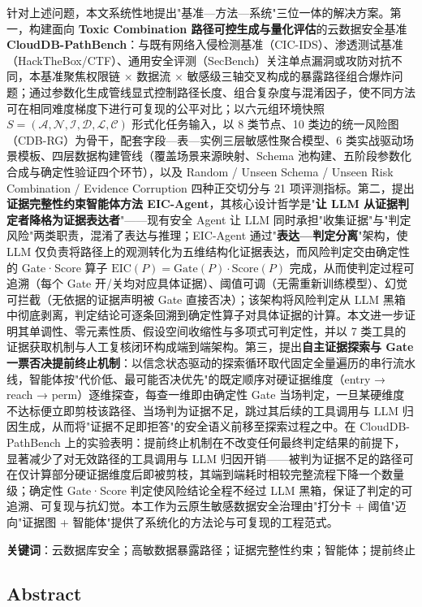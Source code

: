 \documentclass[a4paper,12pt]{ctexart}
\begin{document}
针对上述问题，本文系统性地提出"基准—方法—系统"三位一体的解决方案。第一，构建面向 \textbf{Toxic Combination 路径可控生成与量化评估}的云数据安全基准 \textbf{CloudDB-PathBench}：与既有网络入侵检测基准（CIC-IDS）、渗透测试基准（HackTheBox/CTF）、通用安全评测（SecBench）关注单点漏洞或攻防对抗不同，本基准聚焦权限链 × 数据流 × 敏感级三轴交叉构成的暴露路径组合爆炸问题；通过参数化生成管线显式控制路径长度、组合复杂度与混淆因子，使不同方法可在相同难度梯度下进行可复现的公平对比；以六元组环境快照 $S=(\mathcal{A},\mathcal{N},\mathcal{I},\mathcal{D},\mathcal{L},\mathcal{C})$ 形式化任务输入，以 8 类节点、10 类边的统一风险图（CDB-RG）为骨干，配套字段—表—实例三层敏感性聚合模型、6 类实战驱动场景模板、四层数据构建管线（覆盖场景来源映射、Schema 池构建、五阶段参数化合成与确定性验证四个环节），以及 Random / Unseen Schema / Unseen Risk Combination / Evidence Corruption 四种正交切分与 21 项评测指标。第二，提出\textbf{证据完整性约束智能体方法 EIC-Agent}，其核心设计哲学是"\textbf{让 LLM 从证据判定者降格为证据表达者}"——现有安全 Agent 让 LLM 同时承担"收集证据"与"判定风险"两类职责，混淆了表达与推理；EIC-Agent 通过"\textbf{表达—判定分离}"架构，使 LLM 仅负责将路径上的观测转化为五维结构化证据表达，而风险判定交由确定性的 Gate·Score 算子 $\mathrm{EIC}(P)=\mathrm{Gate}(P)\cdot\mathrm{Score}(P)$ 完成，从而使判定过程可追溯（每个 Gate 开/关均对应具体证据）、阈值可调（无需重新训练模型）、幻觉可拦截（无依据的证据声明被 Gate 直接否决）；该架构将风险判定从 LLM 黑箱中彻底剥离，判定结论可逐条回溯到确定性算子对具体证据的计算。本文进一步证明其单调性、零元素性质、假设空间收缩性与多项式可判定性，并以 7 类工具的证据获取机制与人工复核闭环构成端到端架构。第三，提出\textbf{自主证据探索与 Gate 一票否决提前终止机制}：以信念状态驱动的探索循环取代固定全量遍历的串行流水线，智能体按"代价低、最可能否决优先"的既定顺序对硬证据维度（entry → reach → perm）逐维探查，每查一维即由确定性 Gate 当场判定，一旦某硬维度不达标便立即剪枝该路径、当场判为证据不足，跳过其后续的工具调用与 LLM 归因生成，从而将"证据不足即拒答"的安全语义前移至探索过程之中。在 CloudDB-PathBench 上的实验表明：提前终止机制在不改变任何最终判定结果的前提下，显著减少了对无效路径的工具调用与 LLM 归因开销——被判为证据不足的路径可在仅计算部分硬证据维度后即被剪枝，其端到端耗时相较完整流程下降一个数量级；确定性 Gate·Score 判定使风险结论全程不经过 LLM 黑箱，保证了判定的可追溯、可复现与抗幻觉。本工作为云原生敏感数据安全治理由"打分卡 + 阈值"迈向"证据图 + 智能体"提供了系统化的方法论与可复现的工程范式。

\textbf{关键词}：云数据库安全；高敏数据暴露路径；证据完整性约束；智能体；提前终止

\subsection{Abstract}
\end{document}
